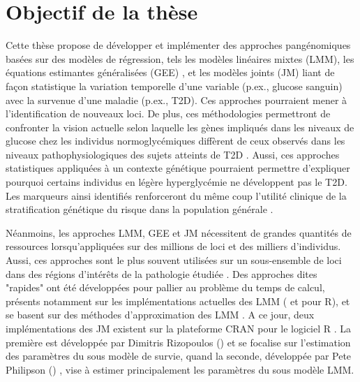 \documentclass[11pt, a4paper]{article}
\begin{document}
\section{Objectif de la thèse}
\par{Cette thèse propose de développer et implémenter des approches pangénomiques basées sur
des modèles de régression, tels les modèles linéaires mixtes (LMM), les équations estimantes généralisées (GEE) \citep{sitlani_generalized_2015},
et les modèles joints (JM) liant de façon statistique la variation temporelle d’une variable (p.ex., glucose sanguin)
avec la survenue d’une maladie (p.ex., T2D). Ces approches pourraient mener à l’identification de nouveaux loci.
De plus, ces méthodologies permettront de confronter la vision actuelle selon laquelle les gènes impliqués
dans les niveaux de glucose chez les individus normoglycémiques diffèrent de ceux observés dans les niveaux
pathophysiologiques des sujets atteints de T2D \citep{yaghootkar_recent_2013}.
Aussi, ces approches statistiques appliquées à un contexte génétique pourraient permettre d’expliquer pourquoi
certains individus en légère hyperglycémie ne développent pas le T2D.
Les marqueurs ainsi identifiés renforceront du même coup l’utilité clinique de la stratification
génétique du risque dans la population générale \citep{pal_genetics_2013}.}

\par{Néanmoins, les approches LMM, GEE et JM nécessitent de grandes quantités de ressources lorsqu'appliquées
sur des millions de loci et des milliers d’individus.
Aussi, ces approches sont le plus souvent utilisées sur un sous-ensemble de loci dans des régions d’intérêts de la
pathologie étudiée \citep{beyene_longitudinal_2014, wu_longitudinal_2014}.
Des approches dites "rapides" ont été développées pour pallier au problème du temps de calcul, présents notamment sur les
implémentations actuelles des LMM ( et  pour R), et se basent sur des méthodes
d’approximation des LMM \citep{sikorska_fast_2013, sikorska_gwas_2015, sikorska_computationally_2014}.
A ce jour, deux implémentations des JM existent sur la plateforme CRAN pour le logiciel R \citep{Rsoftware}.
La première est développée par Dimitris Rizopoulos () \citep{rizopoulos_jm_2010} et se focalise sur l’estimation des paramètres du
sous modèle de survie, quand la seconde, développée par Pete Philipson () \citep{philipson_joiner_2012}, vise à estimer principalement
les paramètres du sous modèle LMM.}
\end{document}
